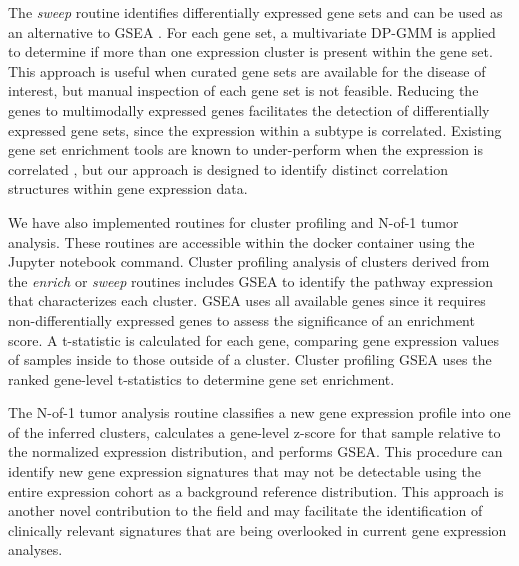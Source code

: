 \documentclass[10pt,letterpaper]{article}
\begin{document}
The \textit{sweep} routine identifies differentially expressed gene sets and can be used as an alternative to GSEA \cite{subramanianGeneSetEnrichment2005}. For each gene set, a multivariate DP-GMM is applied to determine if more than one expression cluster is present within the gene set. This approach is useful when curated gene sets are available for the disease of interest, but manual inspection of each gene set is not feasible. Reducing the genes to multimodally expressed genes facilitates the detection of differentially expressed gene sets, since the expression within a subtype is correlated. Existing gene set enrichment tools are known to under-perform when the expression is correlated \cite{tamayoLimitationsSimpleGene2016}, but our approach is designed to identify distinct correlation structures within gene expression data. 

We have also implemented routines for cluster profiling and N-of-1 tumor analysis. These routines are accessible within the docker container using the Jupyter notebook command. Cluster profiling analysis of clusters derived from the \textit{enrich} or \textit{sweep} routines includes GSEA \cite{korotkevichFastGeneSet2019} to identify the pathway expression that characterizes each cluster. GSEA uses all available genes since it requires non-differentially expressed genes to assess the significance of an enrichment score. A t-statistic is calculated for each gene, comparing gene expression values of samples inside to those outside of a cluster. Cluster profiling GSEA uses the ranked gene-level t-statistics to determine gene set enrichment. 

The N-of-1 tumor analysis routine classifies a new gene expression profile into one of the inferred clusters, calculates a gene-level z-score for that sample relative to the normalized expression distribution, and performs GSEA. This procedure can identify new gene expression signatures that may not be detectable using the entire expression cohort as a background reference distribution. This approach is another novel contribution to the field and may facilitate the identification of clinically relevant signatures that are being overlooked in current gene expression analyses.
\end{document}
